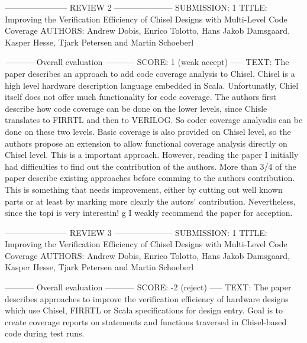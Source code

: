 \documentclass[runningheads]{llncs}
\begin{document}
----------------------- REVIEW 2 ---------------------
SUBMISSION: 1
TITLE: Improving the Verification Efficiency of Chisel Designs with Multi-Level Code Coverage
AUTHORS: Andrew Dobis, Enrico Tolotto, Hans Jakob Damsgaard, Kasper Hesse, Tjark Petersen and Martin Schoeberl

----------- Overall evaluation -----------
SCORE: 1 (weak accept)
----- TEXT:
The paper describes an approach to add code coverage analysis to Chisel. Chisel is a high level hardware description language embedded in Scala. Unfortunatly, Chiel itself does not offer much functionality for code coverage. The authors first describe how code coverage can be done on the lower levels, since Chisle translates to FIRRTL and then to VERILOG. So coder coverage analysdis can be done on these two levels. Basic coverage is also provided on Chisel level, so the authors propose an extension to allow functional coverage analysis directly on Chisel level. This is a important approach. However, reading the paper I initially had difficulties to find out the contribution of the authors. More than 3/4 of the paper describe existing approaches before comming to the authors contribution. This is something that needs improvement, either by cutting out well known parts or at least by marking more clearly the autors' contribution. Nevertheless, since the topi is very interestin!
g I weakly recommend the paper for acception.



----------------------- REVIEW 3 ---------------------
SUBMISSION: 1
TITLE: Improving the Verification Efficiency of Chisel Designs with Multi-Level Code Coverage
AUTHORS: Andrew Dobis, Enrico Tolotto, Hans Jakob Damsgaard, Kasper Hesse, Tjark Petersen and Martin Schoeberl

----------- Overall evaluation -----------
SCORE: -2 (reject)
----- TEXT:
The paper describes approaches to improve the verification efficiency of hardware designs which use Chisel, FIRRTL or Scala specifications for design entry. Goal is to create coverage reports on statements and functions traversed in Chisel-based code during test runs. 
\end{document}
